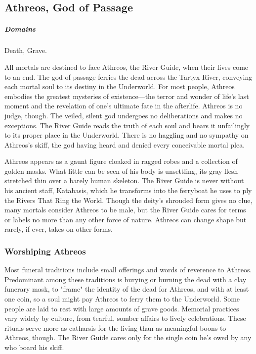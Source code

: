 \subsection*{Athreos, God of Passage} \label{ssec::athreos}
    \subparagraph{Domains} Death, Grave.

    All mortals are destined to face Athreos, the River Guide, when their lives come to an end.
    The god of passage ferries the dead across the Tartyx River, conveying each mortal soul to its destiny in the Underworld. For most people, Athreos embodies the greatest mysteries of existence—the terror and wonder of life's last moment and the revelation of one's ultimate fate in the afterlife. Athreos is no judge, though. The veiled, silent god undergoes no deliberations and makes no exceptions. The River Guide reads the truth of each soul and bears it unfailingly to its proper place in the Underworld. There is no haggling and no sympathy on Athreos's skiff, the god having heard and denied every conceivable mortal plea.

    Athreos appears as a gaunt figure cloaked in ragged robes and a collection of golden masks. What little can be seen of his body is unsettling, its gray flesh stretched thin over a barely human skeleton. The River Guide is never without his ancient staff, Katabasis, which he transforms into the ferryboat he uses to ply the Rivers That Ring the World. Though the deity's shrouded form gives no clue, many mortals consider Athreos to be male, but the River Guide cares for terms or labels no more than any other force of nature. Athreos can change shape but rarely, if ever, takes on other forms.

    \subsubsection{Worshiping Athreos}
        Most funeral traditions include small offerings and words of reverence to Athreos. Predominant among these traditions is burying or burning the dead with a clay funerary mask, to "frame" the identity of the dead for Athreos, and with at least one coin, so a soul might pay Athreos to ferry them to the Underworld. Some people are laid to rest with large amounts of grave goods. Memorial practices vary widely by culture, from tearful, somber affairs to lively celebrations. These rituals serve more as catharsis for the living than as meaningful boons to Athreos, though. The River Guide cares only for the single coin he's owed by any who board his skiff.

